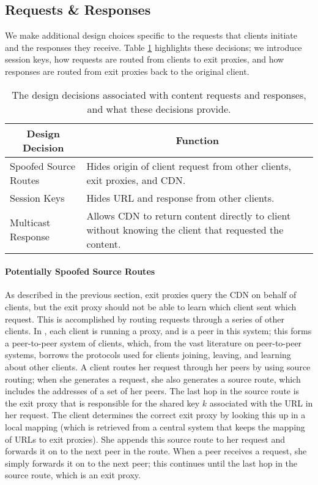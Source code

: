 \subsection{Requests \& Responses}
We make additional design choices specific to the requests that clients initiate and 
the responses they receive.  Table \ref{tab:request_response} highlights these decisions; we 
introduce session keys, how requests are routed from clients to exit proxies, and how responses 
are routed from exit proxies back to the original client.

\begin{table}[t!]
\footnotesize
\centering
\begin{tabular}{ l  p{1.95in} } 
 \multicolumn{1}{c}{\bf Design Decision} & \multicolumn{1}{c}{\bf Function} \\
\hline \hline
Spoofed Source Routes & {Hides origin of client request from other
 clients, exit proxies, and CDN.} \\
 Session Keys & {Hides URL and response from other clients.} \\
 Multicast Response & {Allows CDN to return content directly to client without knowing
 the client that requested the content.} \\
 \hline
\end{tabular}
\caption{The design decisions associated with content requests and responses, and what these 
decisions provide.}
\label{tab:request_response}
\end{table}

\paragraph{Potentially Spoofed Source Routes}
As described in the previous section, exit proxies query the CDN on behalf of clients, but the exit proxy 
should not be able to learn which client sent which request.  This is accomplished by routing requests through 
a series of other clients.  In \system{}, each client is running a proxy, and is a peer in this system; this 
forms a peer-to-peer system of clients, which, from the vast literature on peer-to-peer systems, borrows the 
protocols used for clients joining, leaving, and learning about other clients. A client routes her request through 
her peers by using source routing; when she generates a request, she also generates a source route, which includes 
the addresses of a set of her peers.  The last hop in the source route is the exit proxy that is responsible for the 
shared key $k$ associated with the URL in her request.  The client determines the correct exit proxy by looking this 
up in a local mapping (which is retrieved from a central system that keeps the mapping of URLs to exit proxies).  
She appends this source route to her request and forwards it on to the next peer in the route.  When a peer receives 
a request, she simply forwards it on to the next peer; this continues until the last hop in the source route, which 
is an exit proxy. 

